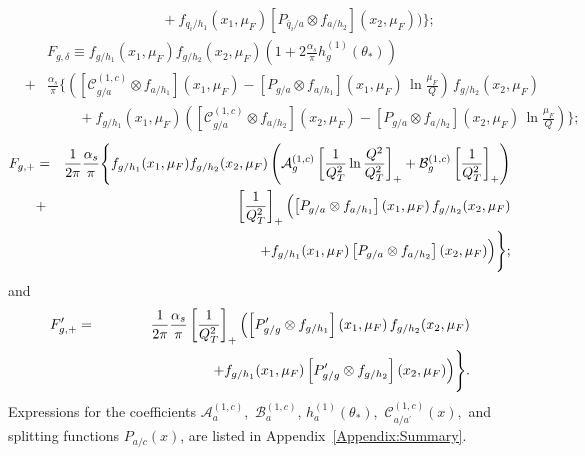 \documentclass[12pt,english,aps,preprint,prd,letterpaper,fleqn,nofootinbib,showpacs,showkeys,tightenlines,floatfix]{revtex4}
\begin{document}
{\begin{eqnarray}
 &  & \hspace{47pt}+f_{q_{i}/h_{1}}(x_{1},\mu_{F})\left[P_{\bar{q}_{i}/a}\otimes f_{a/h_{2}}\right](x_{2},\mu_{F})\Bigr)\Biggr\};\label{FqPlus}\end{eqnarray}
 \begin{eqnarray}
 &  & F_{g,\delta}\equiv f_{g/h_{1}}(x_{1},\mu_{F})f_{g/h_{2}}(x_{2},\mu_{F})\left(1+2\frac{\alpha_{s}}{\pi}h_{g}^{(1)}(\theta_{*})\right)\nonumber \\
 & + & \frac{\alpha_{s}}{\pi}\Biggl\{\left(\left[\mathcal{C}_{g/a}^{(1,c)}\otimes f_{a/h_{1}}\right](x_{1},\mu_{F})-\left[P_{g/a}\otimes f_{a/h_{1}}\right](x_{1},\mu_{F})\,\ln\frac{\mu_{F}}{Q}\right)\, f_{g/h_{2}}(x_{2},\mu_{F})\nonumber \\
 &  & \hspace{27pt}+f_{g/h_{1}}(x_{1},\mu_{F})\left(\left[\mathcal{C}_{g/a}^{(1,c)}\otimes f_{a/h_{2}}\right](x_{2},\mu_{F})-\left[P_{g/a}\otimes f_{a/h_{2}}\right](x_{2},\mu_{F})\,\ln\frac{\mu_{F}}{Q}\right)\Biggr\};\label{FgDelta}\end{eqnarray}
 \begin{eqnarray}
F_{g,+} & = & \frac{1}{2\pi}\frac{\alpha_{s}}{\pi}\Biggl\{ f_{g/h_{1}}(x_{1},\mu_{F})f_{g/h_{2}}(x_{2},\mu_{F})\left(\mathcal{A}_{g}^{(1,c)}\left[\frac{1}{Q_{T}^{2}}\ln\frac{Q^{2}}{Q_{T}^{2}}\right]_{+}+\mathcal{{\mathcal{B}}}_{g}^{(1,c)}\left[\frac{1}{Q_{T}^{2}}\right]_{+}\right)\nonumber \\
 & + & \left[\frac{1}{Q_{T}^{2}}\right]_{+}\Bigl(\left[P_{g/a}\otimes f_{a/h_{1}}\right](x_{1},\mu_{F})\, f_{g/h_{2}}(x_{2},\mu_{F})\nonumber \\
 &  & \hspace{47pt}+f_{g/h_{1}}(x_{1},\mu_{F})\left[P_{g/a}\otimes f_{a/h_{2}}\right](x_{2},\mu_{F})\Bigr)\Biggr\};\label{FgPlus}\end{eqnarray}
 and\begin{eqnarray}
F_{g,+}^{\prime} & = & \frac{1}{2\pi}\frac{\alpha_{s}}{\pi}\left[\frac{1}{Q_{T}^{2}}\right]_{+}\Bigl(\left[P_{g/g}^{\prime}\otimes f_{g/h_{1}}\right](x_{1},\mu_{F})\, f_{g/h_{2}}(x_{2},\mu_{F})\nonumber \\
 &  & \hspace{77pt}+f_{g/h_{1}}(x_{1},\mu_{F})\left[P_{g/g}^{\prime}\otimes f_{g/h_{2}}\right](x_{2},\mu_{F})\Bigr)\Biggr\}.\label{FgPlusPrime}\end{eqnarray}
 Expressions for the coefficients $\mathcal{A}_{a}^{(1,c)},$ $\mathcal{B}_{a}^{(1,c)}$,
$h_{a}^{(1)}(\theta_{*}),$ $\mathcal{C}_{a/a^{\prime}}^{(1,c)}(x),$
and splitting functions $P_{a/c}(x)$, are listed in Appendix~\ref{Appendix:Summary}.
}
\end{document}
